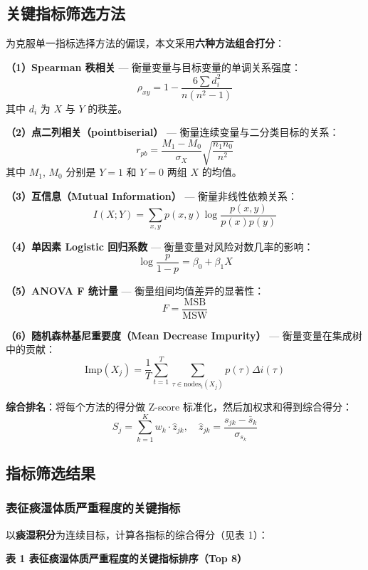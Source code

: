 \documentclass{MathorCupmodeling}
\begin{document}
\subsection{关键指标筛选方法}\label{ux5173ux952eux6307ux6807ux7b5bux9009ux65b9ux6cd5}

为克服单一指标选择方法的偏误，本文采用\textbf{六种方法组合打分}：

\textbf{（1）Spearman 秩相关} --- 衡量变量与目标变量的单调关系强度： \[\rho_{xy} = 1 - \frac{6\sum d_i^2}{n(n^2 - 1)}\] 其中 \(d_i\) 为 \(X\) 与 \(Y\) 的秩差。

\textbf{（2）点二列相关（pointbiserial）} --- 衡量连续变量与二分类目标的关系： \[r_{pb} = \frac{M_1 - M_0}{\sigma_X}\sqrt{\frac{n_1 n_0}{n^2}}\] 其中 \(M_1\), \(M_0\) 分别是 \(Y = 1\) 和 \(Y = 0\) 两组 \(X\) 的均值。

\textbf{（3）互信息（Mutual Information）} --- 衡量非线性依赖关系： \[I(X; Y) = \sum_{x, y} p(x, y) \log \frac{p(x, y)}{p(x)p(y)}\]

\textbf{（4）单因素 Logistic 回归系数} --- 衡量变量对风险对数几率的影响： \[\log \frac{p}{1-p} = \beta_0 + \beta_1 X\]

\textbf{（5）ANOVA F 统计量} --- 衡量组间均值差异的显著性： \[F = \frac{\text{MSB}}{\text{MSW}}\]

\textbf{（6）随机森林基尼重要度（Mean Decrease Impurity）} --- 衡量变量在集成树中的贡献： \[\text{Imp}(X_j) = \frac{1}{T} \sum_{t=1}^{T} \sum_{\tau \in \text{nodes}_t(X_j)} p(\tau)\Delta i(\tau)\]

\textbf{综合排名}：将每个方法的得分做 Z-score 标准化，然后加权求和得到综合得分： \[S_j = \sum_{k=1}^{K} w_k \cdot \hat{z}_{jk}, \quad \hat{z}_{jk} = \frac{s_{jk} - \bar{s}_k}{\sigma_{s_k}}\]

\subsection{指标筛选结果}\label{ux6307ux6807ux7b5bux9009ux7ed3ux679c}

\subsubsection{表征痰湿体质严重程度的关键指标}\label{ux8868ux5f81ux75f0ux6e7fux4f53ux8d28ux4e25ux91cdux7a0bux5ea6ux7684ux5173ux952eux6307ux6807}

以\textbf{痰湿积分}为连续目标，计算各指标的综合得分（见表 1）：

\textbf{表 1 表征痰湿体质严重程度的关键指标排序（Top 8）}
\end{document}
